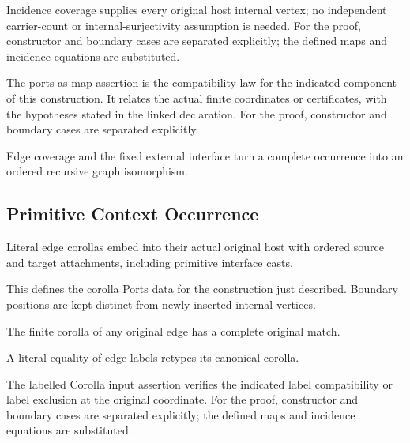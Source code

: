 Incidence coverage supplies every original host internal vertex; no independent carrier-count or internal-surjectivity assumption is needed.
For the proof, constructor and boundary cases are separated explicitly; the defined maps and incidence equations are substituted.
\par{}

The ports as map assertion is the compatibility law for the indicated component of this construction. It relates the actual finite coordinates or certificates, with the hypotheses stated in the linked declaration.
For the proof, constructor and boundary cases are separated explicitly.
\par{}

Edge coverage and the fixed external interface turn a complete occurrence into an ordered recursive graph isomorphism.
\par{}

\subsection{Primitive Context Occurrence}
Literal edge corollas embed into their actual original host with ordered source and target attachments, including primitive interface casts.

This defines the corolla Ports data for the construction just described. Boundary positions are kept distinct from newly inserted internal vertices.
\par{}

The finite corolla of any original edge has a complete original match.
\par{}

A literal equality of edge labels retypes its canonical corolla.
\par{}

The labelled Corolla input assertion verifies the indicated label compatibility or label exclusion at the original coordinate.
For the proof, constructor and boundary cases are separated explicitly; the defined maps and incidence equations are substituted.
\par{}

